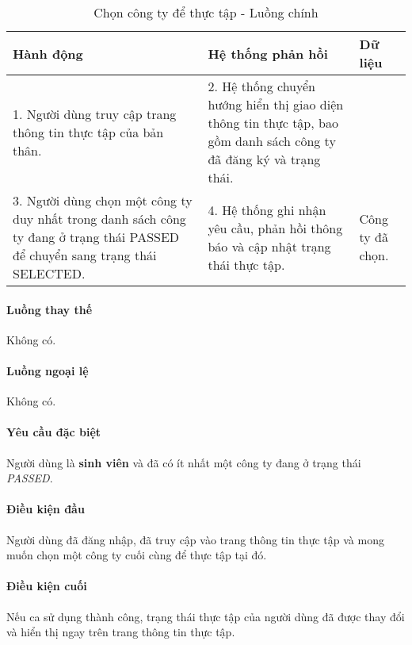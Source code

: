 \documentclass[./../main.tex]{subfiles}
\begin{document}
\begin{table}[H]
  \caption{Chọn công ty để thực tập - Luồng chính}
  \label{tab:select_company}
  \begin{tabularx}{\textwidth}{|X|X|X|}
  \hline
  \textbf{Hành động} &
    \textbf{Hệ thống phản hồi} &
    \textbf{Dữ liệu} \\ \hline
  1. Người dùng truy cập trang thông tin thực tập của bản thân. &
    2. Hệ thống chuyển hướng hiển thị giao diện thông tin thực tập, bao gồm danh sách công ty đã đăng ký và trạng thái. &
     \\ \hline
  3. Người dùng chọn một công ty duy nhất trong danh sách công ty đang ở trạng thái PASSED để chuyển sang trạng thái SELECTED. &
    4. Hệ thống ghi nhận yêu cầu, phản hồi thông báo và cập nhật trạng thái thực tập. &
    Công ty đã chọn. \\ \hline
  \end{tabularx}
\end{table}

\paragraph*{Luồng thay thế} Không có.

\paragraph*{Luồng ngoại lệ} Không có.

\paragraph*{Yêu cầu đặc biệt}

Người dùng là \textbf{sinh viên} và đã có ít nhất một công ty đang ở
trạng thái \emph{PASSED}.

\paragraph*{Điều kiện đầu}

Người dùng đã đăng nhập, đã truy cập vào trang thông tin thực tập và
mong muốn chọn một công ty cuối cùng để thực tập tại đó.

\paragraph*{Điều kiện cuối}

Nếu ca sử dụng thành công, trạng thái thực tập của người dùng đã được
thay đổi và hiển thị ngay trên trang thông tin thực tập.
\end{document}
